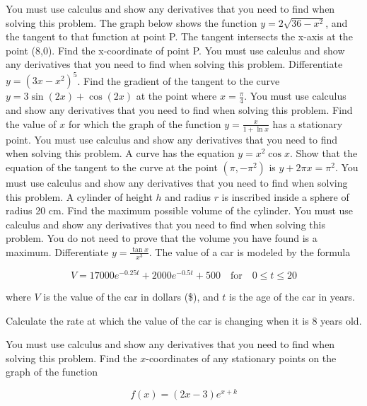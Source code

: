 \documentclass[12pt,addpoints]{exam}
\begin{document}
\begin{questions}
You must use calculus and show any derivatives that you need to find when solving this problem.
\fillwithlines{3cm}
\question[5] The graph below shows the function \( y = 2\sqrt{36 - x^2} \), and the tangent to that function at point P. The tangent intersects the x-axis at the point (8,0). Find the x-coordinate of point P. You must use calculus and show any derivatives that you need to find when solving this problem.
\fillwithlines{3cm}
\question[5] Differentiate \( y = (3x - x^2)^5 \).
\fillwithlines{3cm}
\question[5] Find the gradient of the tangent to the curve \( y = 3\sin(2x) + \cos(2x) \) at the point where \( x = \frac{\pi}{4} \). You must use calculus and show any derivatives that you need to find when solving this problem.
\fillwithlines{3cm}
\question[5] Find the value of \( x \) for which the graph of the function \( y = \frac{x}{1 + \ln x} \) has a stationary point. You must use calculus and show any derivatives that you need to find when solving this problem.
\fillwithlines{3cm}
\question[5] A curve has the equation \( y = x^2 \cos x \). Show that the equation of the tangent to the curve at the point \( \left( \pi, -\pi^2 \right) \) is \( y + 2\pi x = \pi^2 \). You must use calculus and show any derivatives that you need to find when solving this problem.
\fillwithlines{3cm}
\question[5] A cylinder of height \( h \) and radius \( r \) is inscribed inside a sphere of radius 20 cm. Find the maximum possible volume of the cylinder. You must use calculus and show any derivatives that you need to find when solving this problem. You do not need to prove that the volume you have found is a maximum.
\fillwithlines{3cm}
\question[5] Differentiate \( y = \frac{\tan x}{x^3} \).
\fillwithlines{3cm}
\question[5] The value of a car is modeled by the formula

\[ V = 17000 e^{-0.25t} + 2000 e^{-0.5t} + 500 \quad \text{for} \quad 0 \leq t \leq 20 \]

where \( V \) is the value of the car in dollars (\$), and \( t \) is the age of the car in years.

Calculate the rate at which the value of the car is changing when it is 8 years old.

You must use calculus and show any derivatives that you need to find when solving this problem.
\fillwithlines{3cm}
\question[5] Find the \( x \)-coordinates of any stationary points on the graph of the function

\[ f(x) = (2x - 3)e^{x+k} \]


\end{questions}
\end{document}
